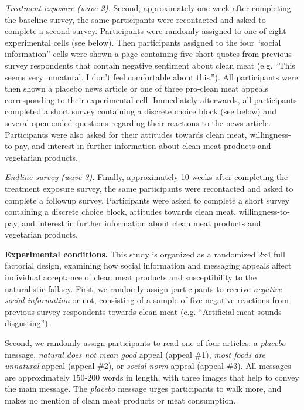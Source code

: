 \documentclass[12pt]{article}
\newcommand{\todo}[1]{\textit{\textcolor{red}{$<$todo$>$ #1 $<$/todo$>$}}}
\begin{document}
\textit{Treatment exposure (wave 2).} Second, approximately one week after completing the baseline survey, the same participants were recontacted and asked to complete a second survey. Participants were randomly assigned to one of eight experimental cells (see below). Then participants assigned to the four ``social information'' cells were shown a page containing five short quotes from previous survey respondents that contain negative sentiment about clean meat (e.g. ``This seems very unnatural. I don't feel comfortable about this.''). All participants were then shown a placebo news article or one of three pro-clean meat appeals corresponding to their experimental cell. Immediately afterwards, all participants completed a short survey containing a discrete choice block (see below) and several open-ended questions regarding their reactions to the news article. Participants were also asked for their attitudes towards clean meat, willingness-to-pay, and interest in further information about clean meat products and vegetarian products.

\textit{Endline survey (wave 3).} Finally, approximately 10 weeks after completing the treatment exposure survey, the same participants were recontacted and asked to complete a followup survey. Participants were asked to complete a short survey containing a discrete choice block, attitudes towards clean meat, willingness-to-pay, and interest in further information about clean meat products and vegetarian products.

\textbf{Experimental conditions.} This study is organized as a randomized 2x4 full factorial design, examining how social information and messaging appeals affect individual acceptance of clean meat products and susceptibility to the naturalistic fallacy. First, we randomly assign participants to receive \textit{negative social information} or not, consisting of a sample of five negative reactions from previous survey respondents towards clean meat (e.g. ``Artificial meat sounds disgusting''). 


Second, we randomly assign participants to read one of four articles: a \textit{placebo} message, \textit{natural does not mean good} appeal (appeal \#1), \textit{most foods are unnatural} appeal (appeal \#2), or \textit{social norm} appeal (appeal \#3). All messages are approximately 150-200 words in length, with three images that help to convey the main message. The \textit{placebo} message urges participants to walk more, and makes no mention of clean meat products or meat consumption.
\end{document}
